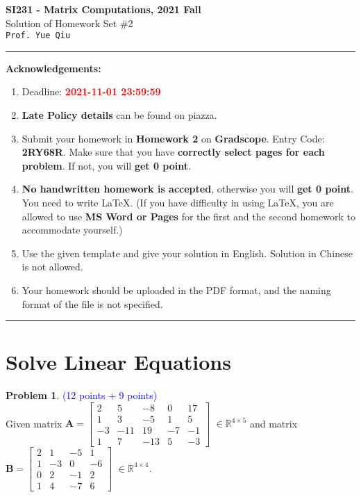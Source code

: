 \documentclass[english,onecolumn]{IEEEtran}
\begin{document}
\begin{center}
	\textbf{\LARGE{SI231 - Matrix Computations, 2021 Fall}}\\
	{\Large Solution of Homework Set \#2}\\
	\texttt{Prof. Yue Qiu}
\par\end{center}

\noindent
\rule{\linewidth}{0.4pt}
{\bf Acknowledgements:}
\begin{enumerate}
	\item Deadline: {\bf \textcolor{red}{2021-11-01 23:59:59}}
	\item \textbf{Late Policy details} can be found on piazza.
	\item Submit your homework in \textbf{Homework 2} on \textbf{Gradscope}. Entry Code: \textbf{2RY68R}. Make sure that you have \textbf{correctly select pages for each problem}. If not, you will \textbf{get 0 point}.
	\item \textbf{No handwritten homework is accepted}, otherwise you will \textbf{get 0 point}. You need to write \LaTeX. (If you have difficulty in using \LaTeX, you are allowed to use \textbf{MS Word or Pages} for the first and the second homework to accommodate yourself.)
	\item Use the given template and give your solution in English. Solution in Chinese is not allowed.
	\item Your homework should be uploaded in the PDF format, and the naming format of the file is not specified.
\end{enumerate}
\rule{\linewidth}{0.4pt}

\section{Solve Linear Equations}

\noindent\textbf{Problem 1}. \textcolor{blue}{(12 points + 9 points)}\\
Given matrix $\mathbf{A} = \begin{bmatrix}
 2 & 5 & -8 & 0 & 17\\ 
 1 & 3 & -5 & 1 & 5\\ 
 -3 & -11 & 19 & -7 & -1\\ 
 1 & 7 & -13 & 5 & -3
\end{bmatrix}$ $ \in \mathbb{R}^{4\times 5} $ and  matrix $\mathbf{B} = \begin{bmatrix}
 2 & 1 & -5 & 1 \\ 
 1 & -3 & 0 & -6 \\ 
 0 & 2 & -1 & 2 \\ 
 1 & 4 & -7 & 6
\end{bmatrix}$ $ \in \mathbb{R}^{4\times 4} $.\\
\end{document}
